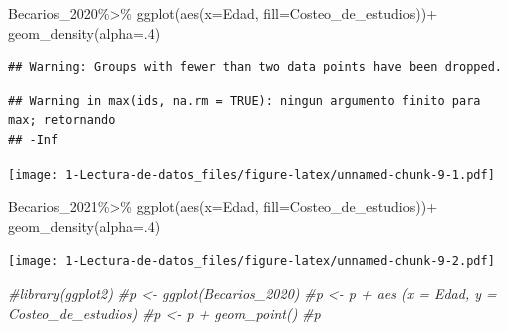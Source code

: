 \documentclass[
]{article}
\newenvironment{Shaded}{\begin{snugshade}}{\end{snugshade}}
\newcommand{\AttributeTok}[1]{\textcolor[rgb]{0.77,0.63,0.00}{#1}}
\newcommand{\CommentTok}[1]{\textcolor[rgb]{0.56,0.35,0.01}{\textit{#1}}}
\newcommand{\DecValTok}[1]{\textcolor[rgb]{0.00,0.00,0.81}{#1}}
\newcommand{\FunctionTok}[1]{\textcolor[rgb]{0.00,0.00,0.00}{#1}}
\newcommand{\NormalTok}[1]{#1}
\newcommand{\SpecialCharTok}[1]{\textcolor[rgb]{0.00,0.00,0.00}{#1}}
\begin{document}
\begin{Shaded}
\begin{Highlighting}[]
\NormalTok{Becarios\_2020}\SpecialCharTok{\%\textgreater{}\%} 
  \FunctionTok{ggplot}\NormalTok{(}\FunctionTok{aes}\NormalTok{(}\AttributeTok{x=}\NormalTok{Edad, }\AttributeTok{fill=}\NormalTok{Costeo\_de\_estudios))}\SpecialCharTok{+}
  \FunctionTok{geom\_density}\NormalTok{(}\AttributeTok{alpha=}\NormalTok{.}\DecValTok{4}\NormalTok{)}
\end{Highlighting}
\end{Shaded}

\begin{verbatim}
## Warning: Groups with fewer than two data points have been dropped.
\end{verbatim}

\begin{verbatim}
## Warning in max(ids, na.rm = TRUE): ningun argumento finito para max; retornando
## -Inf
\end{verbatim}

\texttt{[image: 1-Lectura-de-datos\_files/figure-latex/unnamed-chunk-9-1.pdf]}

\begin{Shaded}
\begin{Highlighting}[]
\NormalTok{Becarios\_2021}\SpecialCharTok{\%\textgreater{}\%} 
  \FunctionTok{ggplot}\NormalTok{(}\FunctionTok{aes}\NormalTok{(}\AttributeTok{x=}\NormalTok{Edad, }\AttributeTok{fill=}\NormalTok{Costeo\_de\_estudios))}\SpecialCharTok{+}
  \FunctionTok{geom\_density}\NormalTok{(}\AttributeTok{alpha=}\NormalTok{.}\DecValTok{4}\NormalTok{)}
\end{Highlighting}
\end{Shaded}

\texttt{[image: 1-Lectura-de-datos\_files/figure-latex/unnamed-chunk-9-2.pdf]}

\begin{Shaded}
\begin{Highlighting}[]
\CommentTok{\#library(ggplot2)}
\CommentTok{\#p \textless{}{-} ggplot(Becarios\_2020)}
\CommentTok{\#p \textless{}{-} p + aes (x = Edad, y = Costeo\_de\_estudios)}
\CommentTok{\#p \textless{}{-} p + geom\_point()}
\CommentTok{\#p}
\end{Highlighting}
\end{Shaded}
\end{document}
